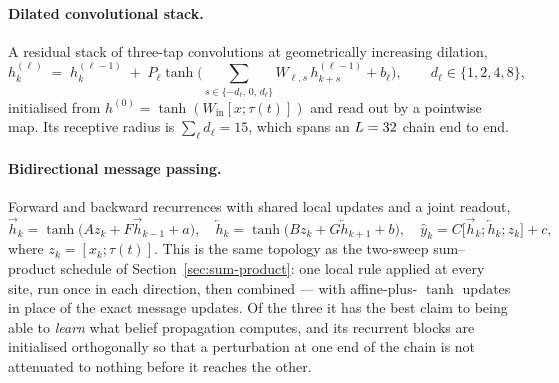 \paragraph{Dilated convolutional stack.} A residual stack of three-tap
convolutions at geometrically increasing dilation,
\begin{equation}
  h^{(\ell)}_k \;=\; h^{(\ell-1)}_k
  \;+\; P_\ell \tanh\!\Big(\textstyle\sum_{s \in \{-d_\ell,\,0,\,d_\ell\}} W_{\ell,s}\, h^{(\ell-1)}_{k+s} + b_\ell\Big),
  \qquad d_\ell \in \{1,2,4,8\},
  \label{eq:em-dilated}
\end{equation}
initialised from $h^{(0)} = \tanh(W_{\mathrm{in}}[x;\tau(t)])$ and read out by a
pointwise map. Its receptive radius is $\sum_\ell d_\ell = 15$, which spans an
$L = 32$ chain end to end.

\paragraph{Bidirectional message passing.} Forward and backward recurrences with
shared local updates and a joint readout,
\begin{equation}
  \overrightarrow{h}_k = \tanh\!\big(A z_k + F \overrightarrow{h}_{k-1} + a\big),
  \quad
  \overleftarrow{h}_k = \tanh\!\big(B z_k + G \overleftarrow{h}_{k+1} + b\big),
  \quad
  \widehat{y}_k = C\big[\overrightarrow{h}_k; \overleftarrow{h}_k; z_k\big] + c,
  \label{eq:em-bimp}
\end{equation}
where $z_k = [x_k; \tau(t)]$. This is the same topology as the two-sweep
sum--product schedule of Section~\ref{sec:sum-product}: one local rule applied
at every site, run once in each direction, then combined --- with affine-plus-%
$\tanh$ updates in place of the exact message updates. Of the three it has the
best claim to being able to \emph{learn} what belief propagation computes, and
its recurrent blocks are initialised orthogonally so that a perturbation at one
end of the chain is not attenuated to nothing before it reaches the other.

